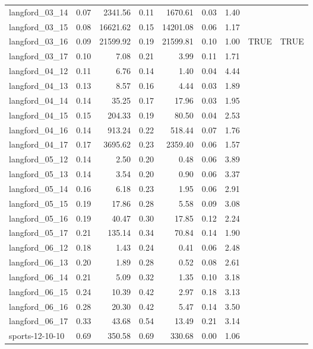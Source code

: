 \documentclass[runningheads]{llncs}
\begin{document}
\begin{table}[ht]
\begin{tabular}{lrrrrrrll}
 langford\_03\_14 & 0.07 & 2341.56 & 0.11 & 1670.61 & 0.03 & 1.40 &   &   \\ 
 langford\_03\_15 & 0.08 & 16621.62 & 0.15 & 14201.08 & 0.06 & 1.17 &   &   \\ 
 langford\_03\_16 & 0.09 & 21599.92 & 0.19 & 21599.81 & 0.10 & 1.00 & TRUE & TRUE \\ 
 langford\_03\_17 & 0.10 & 7.08 & 0.21 & 3.99 & 0.11 & 1.71 &   &   \\ 
 langford\_04\_12 & 0.11 & 6.76 & 0.14 & 1.40 & 0.04 & 4.44 &   &   \\ 
 langford\_04\_13 & 0.13 & 8.57 & 0.16 & 4.44 & 0.03 & 1.89 &   &   \\ 
 langford\_04\_14 & 0.14 & 35.25 & 0.17 & 17.96 & 0.03 & 1.95 &   &   \\ 
 langford\_04\_15 & 0.15 & 204.33 & 0.19 & 80.50 & 0.04 & 2.53 &   &   \\ 
 langford\_04\_16 & 0.14 & 913.24 & 0.22 & 518.44 & 0.07 & 1.76 &   &   \\ 
 langford\_04\_17 & 0.17 & 3695.62 & 0.23 & 2359.40 & 0.06 & 1.57 &   &   \\ 
 langford\_05\_12 & 0.14 & 2.50 & 0.20 & 0.48 & 0.06 & 3.89 &   &   \\ 
 langford\_05\_13 & 0.14 & 3.54 & 0.20 & 0.90 & 0.06 & 3.37 &   &   \\ 
 langford\_05\_14 & 0.16 & 6.18 & 0.23 & 1.95 & 0.06 & 2.91 &   &   \\ 
 langford\_05\_15 & 0.19 & 17.86 & 0.28 & 5.58 & 0.09 & 3.08 &   &   \\ 
 langford\_05\_16 & 0.19 & 40.47 & 0.30 & 17.85 & 0.12 & 2.24 &   &   \\ 
 langford\_05\_17 & 0.21 & 135.14 & 0.34 & 70.84 & 0.14 & 1.90 &   &   \\ 
 langford\_06\_12 & 0.18 & 1.43 & 0.24 & 0.41 & 0.06 & 2.48 &   &   \\ 
 langford\_06\_13 & 0.20 & 1.89 & 0.28 & 0.52 & 0.08 & 2.61 &   &   \\ 
 langford\_06\_14 & 0.21 & 5.09 & 0.32 & 1.35 & 0.10 & 3.18 &   &   \\ 
 langford\_06\_15 & 0.24 & 10.39 & 0.42 & 2.97 & 0.18 & 3.13 &   &   \\ 
 langford\_06\_16 & 0.28 & 20.30 & 0.42 & 5.47 & 0.14 & 3.50 &   &   \\ 
 langford\_06\_17 & 0.33 & 43.68 & 0.54 & 13.49 & 0.21 & 3.14 &   &   \\ 
 sports-12-10-10 & 0.69 & 350.58 & 0.69 & 330.68 & 0.00 & 1.06 &   &   \\ 

\end{tabular}
\end{table}
\end{document}
